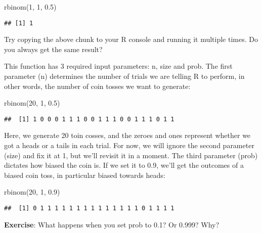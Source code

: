 \documentclass[
]{book}
\newenvironment{Shaded}{\begin{snugshade}}{\end{snugshade}}
\newcommand{\DecValTok}[1]{\textcolor[rgb]{0.00,0.00,0.81}{#1}}
\newcommand{\FloatTok}[1]{\textcolor[rgb]{0.00,0.00,0.81}{#1}}
\newcommand{\FunctionTok}[1]{\textcolor[rgb]{0.00,0.00,0.00}{#1}}
\newcommand{\NormalTok}[1]{#1}
\begin{document}
\begin{Shaded}
\begin{Highlighting}[]
\FunctionTok{rbinom}\NormalTok{(}\DecValTok{1}\NormalTok{, }\DecValTok{1}\NormalTok{, }\FloatTok{0.5}\NormalTok{)}
\end{Highlighting}
\end{Shaded}

\begin{verbatim}
## [1] 1
\end{verbatim}

Try copying the above chunk to your R console and running it multiple times. Do you always get the same result?

This function has 3 required input parameters: n, size and prob. The first parameter (n) determines the number of trials we are telling R to perform, in other words, the number of coin tosses we want to generate:

\begin{Shaded}
\begin{Highlighting}[]
\FunctionTok{rbinom}\NormalTok{(}\DecValTok{20}\NormalTok{, }\DecValTok{1}\NormalTok{, }\FloatTok{0.5}\NormalTok{)}
\end{Highlighting}
\end{Shaded}

\begin{verbatim}
##  [1] 1 0 0 0 1 1 1 0 0 1 1 1 0 0 1 1 1 0 1 1
\end{verbatim}

Here, we generate 20 toin cosses, and the zeroes and ones represent whether we got a heads or a tails in each trial. For now, we will ignore the second parameter (size) and fix it at 1, but we'll revisit it in a moment. The third parameter (prob) dictates how biased the coin is. If we set it to 0.9, we'll get the outcomes of a biased coin toss, in particular biased towards heads:

\begin{Shaded}
\begin{Highlighting}[]
\FunctionTok{rbinom}\NormalTok{(}\DecValTok{20}\NormalTok{, }\DecValTok{1}\NormalTok{, }\FloatTok{0.9}\NormalTok{)}
\end{Highlighting}
\end{Shaded}

\begin{verbatim}
##  [1] 0 1 1 1 1 1 1 1 1 1 1 1 1 1 1 0 1 1 1 1
\end{verbatim}

\textbf{Exercise}: What happens when you set prob to 0.1? Or 0.999? Why?
\end{document}
